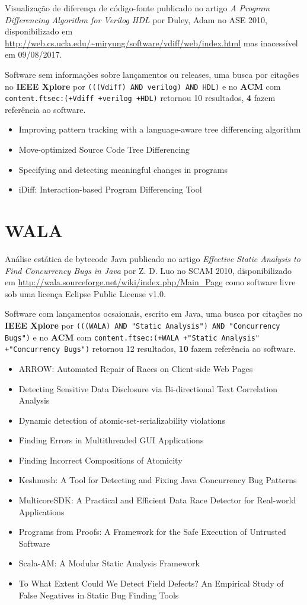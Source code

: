 Visualização de diferença de código-fonte
publicado no artigo {\it A Program Differencing Algorithm for Verilog HDL}
por Duley, Adam
no ASE 2010,
disponibilizado em \url{http://web.cs.ucla.edu/~miryung/software/vdiff/web/index.html}
mas inacessível em 09/08/2017.

Software sem informações sobre lançamentos ou releases,
uma busca por citações no {\bf IEEE Xplore} por
\texttt{(((Vdiff) AND verilog) AND HDL)}
e no {\bf ACM} com
\texttt{content.ftsec:(+Vdiff +verilog +HDL)}
retornou
10 resultados,
{\bf 4} fazem referência ao software.

\begin{itemize}
\item Improving pattern tracking with a language-aware tree differencing algorithm
\item Move-optimized Source Code Tree Differencing
\item Specifying and detecting meaningful changes in programs
\item iDiff: Interaction-based Program Differencing Tool
\end{itemize}


\section{WALA}

Análise estática de bytecode Java
publicado no artigo {\it Effective Static Analysis to Find Concurrency Bugs in Java}
por Z. D. Luo
no SCAM 2010,
disponibilizado em \url{http://wala.sourceforge.net/wiki/index.php/Main_Page}
como software livre
sob uma licença Eclipse Public License v1.0.

Software com lançamentos ocsaionais,
escrito em Java,
uma busca por citações no {\bf IEEE Xplore} por
\texttt{(((WALA) AND "Static Analysis") AND "Concurrency Bugs")}
e no {\bf ACM} com
\texttt{content.ftsec:(+WALA +"Static Analysis" +"Concurrency Bugs")}
retornou
12 resultados,
{\bf 10} fazem referência ao software.

\begin{itemize}
\item ARROW: Automated Repair of Races on Client-side Web Pages
\item Detecting Sensitive Data Disclosure via Bi-directional Text Correlation Analysis
\item Dynamic detection of atomic-set-serializability violations
\item Finding Errors in Multithreaded GUI Applications
\item Finding Incorrect Compositions of Atomicity
\item Keshmesh: A Tool for Detecting and Fixing Java Concurrency Bug Patterns
\item MulticoreSDK: A Practical and Efficient Data Race Detector for Real-world Applications
\item Programs from Proofs: A Framework for the Safe Execution of Untrusted Software
\item Scala-AM: A Modular Static Analysis Framework
\item To What Extent Could We Detect Field Defects? An Empirical Study of False Negatives in Static Bug Finding Tools
\end{itemize}

